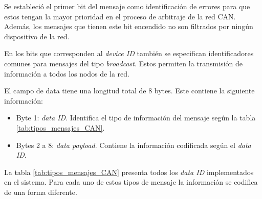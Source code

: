 Se estableció el primer bit del mensaje como identificación de errores para que  estos tengan la mayor prioridad en el proceso de arbitraje de la red CAN. Además, los mensajes que tienen este bit encendido no son filtrados por ningún dispositivo de la red.

En los bits que corresponden al \textit{device ID} también se especifican identificadores comunes para mensajes del tipo \textit{broadcast}. Estos permiten la transmisión de información a todos los nodos de la red.



El campo de data tiene una longitud total de 8 bytes. Este contiene la siguiente información:
\begin{itemize}
	\item Byte 1: \textit{data ID}. Identifica el tipo de información del mensaje según la tabla \ref{tab:tipos_mensajes_CAN}.
	\item Bytes 2 a 8: \textit{data payload}. Contiene la información codificada según el \textit{data ID}.
\end{itemize}

La tabla \ref{tab:tipos_mensajes_CAN} presenta todos los \textit{data ID} implementados en el sistema. Para cada uno de estos tipos de mensaje la información se codifica de una forma diferente.


